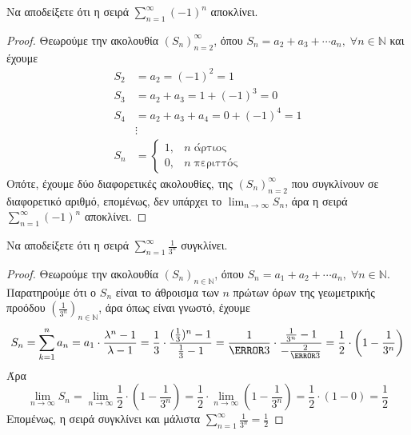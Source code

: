 \begin{example}
  Να αποδείξετε ότι η σειρά $ \sum_{n=1}^{\infty} (-1)^{n} $ αποκλίνει.
\end{example}
  \begin{proof}
    Θεωρούμε την ακολουθία $ {(S_{n})}_{n=2}^{\infty} $, όπου $ S_{n}= a_{2}+ a_{3} +
    \cdots a_{n}, \; \forall n \in \mathbb{N} $ και έχουμε
  \begin{align*}
    S_{2} &= a_{2} = (-1)^{2}=1 \\
    S_{3} &= a_{2}+ a_{3} = 1 + (-1)^{3} = 0 \\
    S_{4} &= a_{2}+ a_{3} + a_{4} = 0 + (-1)^{4} = 1 \\
    &\vdots \\
    S_{n} &= 
    \begin{cases}
      1,  &n \; \text{άρτιος} \\
      0,  &n \; \text{περιττός} 
    \end{cases}
   \end{align*} 
 Οπότε, έχουμε δύο διαφορετικές ακολουθίες, της $ {(S_{n})}_{n=2}^{\infty} $ 
 που συγκλίνουν σε διαφορετικό αριθμό, επομένως, δεν υπάρχει το 
 $ \lim_{n \to \infty} S_{n} $, άρα η σειρά $ \sum_{n=1}^{\infty} (-1)^{n} $ αποκλίνει.
  \end{proof}

\begin{example}
  Να αποδείξετε ότι η σειρά $ \sum_{n=1}^{\infty} \frac{1}{3^{n}} $ συγκλίνει.
\end{example}
\begin{proof}
  Θεωρούμε την ακολουθία $ {(S_{n})}_{n \in \mathbb{N}} $, όπου $ S_{n}= a_{1}+ a_{2} +
  \cdots a_{n}, \; \forall n \in \mathbb{N} $. 
  Παρατηρούμε ότι ο $ S_{n} $ είναι το άθροισμα των $n$ πρώτων όρων της γεωμετρικής 
  προόδου
  $ (\frac{1}{3^{n}})_{n \in \mathbb{N}} $, άρα όπως είναι γνωστό, έχουμε
  \[
    S_{n} = \sum_{k=1}^{n} a_{n} = a_{1} \cdot \frac{\lambda ^{n}-1}{\lambda -1} = 
    \frac{1}{3} \cdot \frac{(\frac{1}{3} )^{n}-1}{\frac{1}{3} - 1} 
    = \frac{1}{\cancel{3}} \cdot \frac{\frac{1}{3^{n}} - 1}{- \frac{2}{\cancel{3}}} 
    = \frac{1}{2} \cdot \left(1 - \frac{1}{3^{n}}\right)
  \] 
  Άρα
  \[ 
    \lim_{n \to \infty} S_{n} = \lim_{n \to \infty} \frac{1}{2} \cdot 
    \left(1 - \frac{1}{3^{n}}\right) = \frac{1}{2} \cdot \lim_{n \to \infty} 
    \left(1 - \frac{1}{3^{n}}\right) = \frac{1}{2} \cdot (1-0) = \frac{1}{2}
  \]
  Επομένως, η σειρά συγκλίνει και μάλιστα 
  $ \sum_{n=1}^{\infty} \frac{1}{3^{n}} = \frac{1}{2} $
\end{proof}

